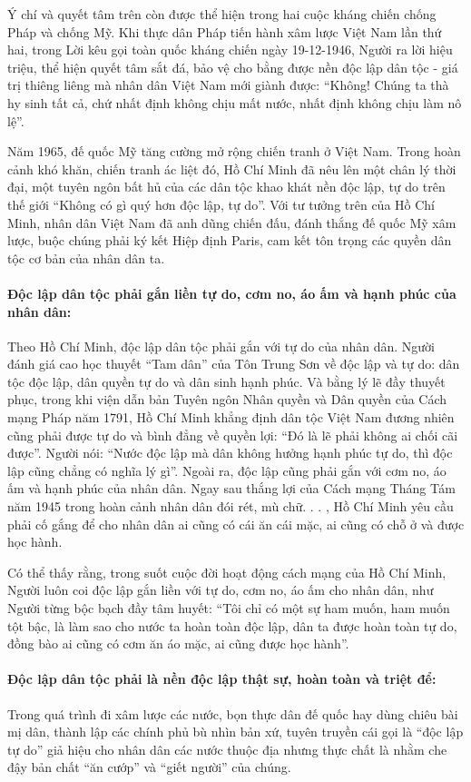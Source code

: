 Ý chí và quyết tâm trên còn được thể hiện trong hai cuộc kháng chiến chống Pháp và chống Mỹ. Khi thực dân Pháp tiến hành xâm lược Việt Nam lần thứ hai, trong Lời kêu gọi toàn quốc kháng chiến ngày 19-12-1946, Người ra lời hiệu triệu, thể hiện quyết tâm sắt đá, bảo vệ cho bằng được nền độc lập dân tộc - giá trị thiêng liêng mà nhân dân Việt Nam mới giành được: ``Không! Chúng ta thà hy sinh tất cả, chứ nhất định không chịu mất nước, nhất định không chịu làm nô lệ''.

Năm 1965, đế quốc Mỹ tăng cường mở rộng chiến tranh ở Việt Nam. Trong hoàn cảnh khó khăn, chiến tranh ác liệt đó, Hồ Chí Minh đã nêu lên một chân lý thời đại, một tuyên ngôn bất hủ của các dân tộc khao khát nền độc lập, tự do trên thế giới ``Không có gì quý hơn độc lập, tự do''. Với tư tưởng trên của Hồ Chí Minh, nhân dân Việt Nam đã anh dũng chiến đấu, đánh thắng đế quốc Mỹ xâm lược, buộc chúng phải ký kết Hiệp định Paris, cam kết tôn trọng các quyền dân tộc cơ bản của nhân dân ta.

\paragraph{Độc lập dân tộc phải gắn liền tự do, cơm no, áo ấm và hạnh phúc của nhân dân:}
Theo Hồ Chí Minh, độc lập dân tộc phải gắn với tự do của nhân dân. Người đánh giá cao học thuyết ``Tam dân'' của Tôn Trung Sơn về độc lập và tự do: dân tộc độc lập, dân quyền tự do và dân sinh hạnh phúc. Và bằng lý lẽ đầy thuyết phục, trong khi viện dẫn bản Tuyên ngôn Nhân quyền và Dân quyền của Cách mạng Pháp năm 1791, Hồ Chí Minh khẳng định dân tộc Việt Nam đương nhiên cũng phải được tự do và bình đẳng về quyền lợi: ``Đó là lẽ phải không ai chối cãi được''. Người nói: ``Nước độc lập mà dân không hưởng hạnh phúc tự do, thì độc lập cũng chẳng có nghĩa lý gì''. Ngoài ra, độc lập cũng phải gắn với cơm no, áo ấm và hạnh phúc của nhân dân. Ngay sau thắng lợi của Cách mạng Tháng Tám năm 1945 trong hoàn cảnh nhân dân đói rét, mù chữ. . . , Hồ Chí Minh yêu cầu phải cố gắng để cho nhân dân ai cũng có cái ăn cái mặc, ai cũng có chỗ ở và được học hành.

Có thể thấy rằng, trong suốt cuộc đời hoạt động cách mạng của Hồ Chí Minh, Người luôn coi độc lập gắn liền với tự do, cơm no, áo ấm cho nhân dân, như Người từng bộc bạch đầy tâm huyết: ``Tôi chỉ có một sự ham muốn, ham muốn tột bậc, là làm sao cho nước ta hoàn toàn độc lập, dân ta được hoàn toàn tự do, đồng bào ai cũng có cơm ăn áo mặc, ai cũng được học hành''.

\paragraph{Độc lập dân tộc phải là nền độc lập thật sự, hoàn toàn và triệt để:}
Trong quá trình đi xâm lược các nước, bọn thực dân đế quốc hay dùng chiêu bài mị dân, thành lập các chính phủ bù nhìn bản xứ, tuyên truyền cái gọi là ``độc lập tự do'' giả hiệu cho nhân dân các nước thuộc địa nhưng thực chất là nhằm che đậy bản chất ``ăn cướp'' và ``giết người'' của chúng.

